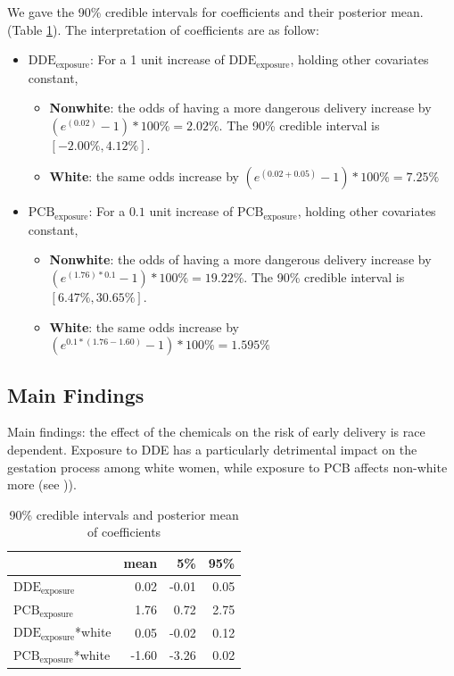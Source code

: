\documentclass[wcp]{jmlr}%
\begin{document}
We gave the 90\% credible intervals for coefficients and their posterior mean. (Table \ref{tab:confints}). The interpretation of coefficients are as follow:
\begin{itemize}
	\item $\text{DDE}_{\text{exposure}}$: For a 1 unit increase of $\text{DDE}_{\text{exposure}}$, holding other covariates constant,
		    \begin{itemize}
		    	\item \textbf{Nonwhite}: the odds of having a more dangerous delivery increase by $(e^{(0.02)}-1)*100\%=2.02\%$. The 90\% credible interval is $[-2.00\%, 4.12\%]$.
		    	\item \textbf{White}:  the same odds increase by $(e^{(0.02+0.05)}-1)*100\%=7.25\%$
		    \end{itemize}
	\item $\text{PCB}_{\text{exposure}}$: For a $0.1$ unit increase of $\text{PCB}_{\text{exposure}}$, holding other covariates constant,
			\begin{itemize}
				\item \textbf{Nonwhite}: the odds of having a more dangerous delivery increase by $(e^{(1.76)*0.1}-1)*100\%=19.22\%$. The 90\% credible interval is $[6.47\%,30.65\%]$.
				\item \textbf{White}:  the same odds increase by $(e^{0.1*(1.76-1.60)}-1)*100\%=1.595\%$
			\end{itemize}
\end{itemize}


\subsection{Main Findings}

Main findings: the effect of the chemicals on the risk of early delivery is race dependent. Exposure to DDE has a particularly detrimental impact on the gestation process among white women, while exposure to PCB affects non-white more (see )).

\begin{table}
	\centering
	\begin{tabular}{l|r|r|r}
		\hline
		& mean & 5\% & 95\%\\
		\hline
		$\text{DDE}_{\text{exposure}}$ & 0.02 & -0.01 & 0.05\\
		\hline
		$\text{PCB}_{\text{exposure}}$& 1.76 & 0.72 & 2.75\\
		\hline
		$\text{DDE}_{\text{exposure}}$*white & 0.05 & -0.02 & 0.12\\
		\hline
		$\text{PCB}_{\text{exposure}}$*white & -1.60 & -3.26 & 0.02\\
		\hline
	\end{tabular}
    \caption{\label{tab:confints} 90\% credible intervals and posterior mean of coefficients}
\end{table}
\end{document}
